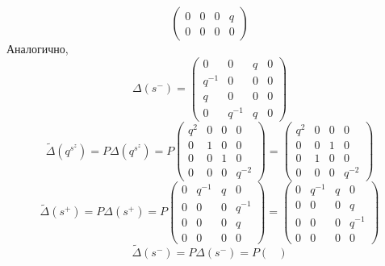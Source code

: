 \documentclass[12pt]{article}
\theoremstyle{definition}
\begin{document}
\begin{enumerate}
\begin{equation}
\begin{pmatrix}
            0 & 0 & 0 & q\\
            0 & 0 & 0 & 0
        \end{pmatrix}
    \end{equation}
    Аналогично,
    \begin{equation}
        \Delta(s^-)=\begin{pmatrix}
            0 & 0 & q & 0\\
            q^{-1} & 0 & 0 & 0\\
            q & 0 & 0 & 0\\
            0 & q^{-1} & q & 0
        \end{pmatrix}
    \end{equation}
    \begin{equation}
        \tilde\Delta(q^{s^z})=P\Delta(q^{s^z})=P\begin{pmatrix}
            q^2 & 0 & 0 & 0\\
            0 & 1 & 0 & 0\\
            0 & 0 & 1 & 0\\
            0 & 0 & 0 & q^{-2}
        \end{pmatrix}=\begin{pmatrix}
            q^2 & 0 & 0 & 0\\
            0 & 0 & 1 & 0\\
            0 & 1 & 0 & 0\\
            0 & 0 & 0 & q^{-2}
        \end{pmatrix}
    \end{equation}
    \begin{equation}
        \tilde\Delta(s^+)=P\Delta(s^+)=P\begin{pmatrix}
            0 & q^{-1} & q & 0\\
            0 & 0 & 0 & q^{-1}\\
            0 & 0 & 0 & q\\
            0 & 0 & 0 & 0
        \end{pmatrix}=\begin{pmatrix}
            0 & q^{-1} & q & 0\\
            0 & 0 & 0 & q\\
            0 & 0 & 0 & q^{-1}\\
            0 & 0 & 0 & 0
        \end{pmatrix}
    \end{equation}
    \begin{equation}
        \tilde\Delta(s^-)=P\Delta(s^-)=P\begin{pmatrix}

\end{pmatrix}
\end{equation}
\end{enumerate}
\end{document}

